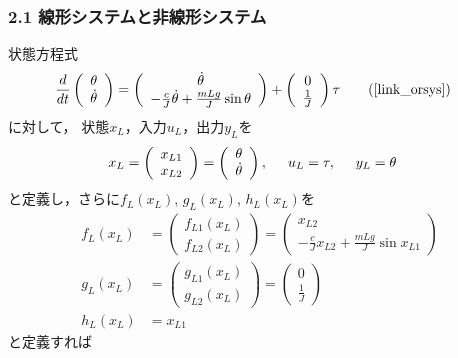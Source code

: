 \begin{frame}[t]
\frametitle{2.1 線形システムと非線形システム}
状態方程式
\begin{align}
	\frac{d}{dt} \left(\begin{array}{c} 
			\theta \\ 
			\dot{\theta} 
		      \end{array}\right)
			&=  \left(\begin{array}{c}
				\dot{\theta} \\
				- \frac{c}{J} \dot{\theta}
				+ \frac{m L g}{J} \sin \theta 
 			      \end{array}\right)
				+ \left(\begin{array}{c}
					0 \\
					\frac{1}{J}
				  \end{array}\right)
				  \tau
	\tag{\ref{link_orsys}}
\end{align}
に対して，
状態$x_L$，入力$u_L$，出力$y_L$を
\begin{align}
	x_L &= \left(\begin{array}{c} 
			x_{L1} \\
			x_{L2} 
		   \end{array}\right) 
			= \left(\begin{array}{c} 
					\theta \\ 
					\dot{\theta} 
			 	\end{array}\right)
,\hspace{5mm}
	u_L = \tau
,\hspace{5mm}
	y_L= \theta
\end{align}
と定義し，さらに$f_L(x_L)$, $g_L(x_L)$, $h_L(x_L)$を
\begin{align}
	f_L(x_L) 
		& =  \left(\begin{array}{c} 
				f_{L1}(x_L) \\
				f_{L2}(x_L) 
			   \end{array}\right) 
		  =  \left(\begin{array}{c}
				x_{L2} \\
				- \frac{c}{J} x_{L2}
					+ \frac{m L g}{J} \sin x_{L1}
		 	   \end{array}\right)
\\
	g_L(x_L) 
		& =  \left(\begin{array}{c} 
				g_{L1}(x_L) \\
				g_{L2}(x_L) 
			   \end{array}\right) 
		  =   \left(\begin{array}{c}
				0 \\
				\frac{1}{J}
			   \end{array}\right)
\\
	h_L(x_L)
		& = x_{L1}
\end{align}
と定義すれば
\end{frame}

